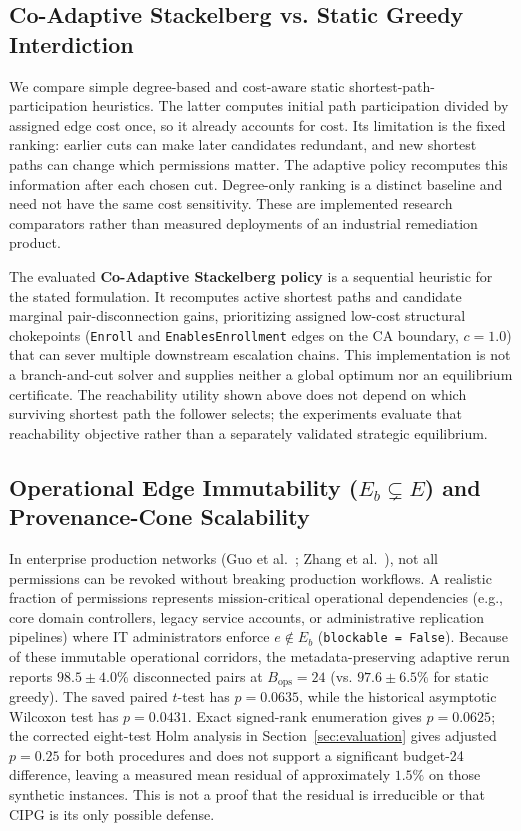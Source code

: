 \subsection{Co-Adaptive Stackelberg vs. Static Greedy Interdiction}
We compare simple degree-based and cost-aware static shortest-path-participation heuristics. The latter computes initial path participation divided by assigned edge cost once, so it already accounts for cost. Its limitation is the fixed ranking: earlier cuts can make later candidates redundant, and new shortest paths can change which permissions matter. The adaptive policy recomputes this information after each chosen cut. Degree-only ranking is a distinct baseline and need not have the same cost sensitivity. These are implemented research comparators rather than measured deployments of an industrial remediation product.

The evaluated \textbf{Co-Adaptive Stackelberg policy} is a sequential heuristic for the stated formulation. It recomputes active shortest paths and candidate marginal pair-disconnection gains, prioritizing assigned low-cost structural chokepoints (\texttt{Enroll} and \texttt{EnablesEnrollment} edges on the CA boundary, $c = 1.0$) that can sever multiple downstream escalation chains. This implementation is not a branch-and-cut solver and supplies neither a global optimum nor an equilibrium certificate. The reachability utility shown above does not depend on which surviving shortest path the follower selects; the experiments evaluate that reachability objective rather than a separately validated strategic equilibrium.

\subsection{Operational Edge Immutability ($E_b \subsetneq E$) and Provenance-Cone Scalability}
In enterprise production networks (Guo et al.~\cite{guo2023scalable,guo2024limited}; Zhang et al.~\cite{zhang2025rethinking}), not all permissions can be revoked without breaking production workflows. A realistic fraction of permissions represents mission-critical operational dependencies (e.g., core domain controllers, legacy service accounts, or administrative replication pipelines) where IT administrators enforce $e \notin E_b$ (\texttt{blockable = False}). Because of these immutable operational corridors, the metadata-preserving adaptive rerun reports $98.5 \pm 4.0\%$ disconnected pairs at $B_{\text{ops}}=24$ (vs. $97.6 \pm 6.5\%$ for static greedy). The saved paired $t$-test has $p=0.0635$, while the historical asymptotic Wilcoxon test has $p=0.0431$. Exact signed-rank enumeration gives $p=0.0625$; the corrected eight-test Holm analysis in Section~\ref{sec:evaluation} gives adjusted $p=0.25$ for both procedures and does not support a significant budget-24 difference, leaving a measured mean residual of approximately $1.5\%$ on those synthetic instances. This is not a proof that the residual is irreducible or that CIPG is its only possible defense.

